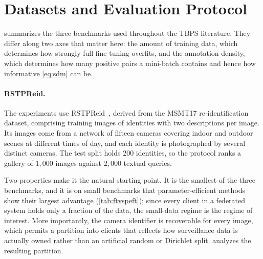 \section{Datasets and Evaluation Protocol}\label{sec:data}

 summarizes the three benchmarks used throughout the TBPS literature. They differ along two axes that matter here: the amount of training data, which determines how strongly full fine-tuning overfits, and the annotation density, which determines how many positive pairs a mini-batch contains and hence how informative \cref{eq:sdm} can be.

\begin{table}[t]
\centering\small
\caption{The three standard TBPS benchmarks, as reported by the authors of DM-Adapter and UP-Person. This report uses RSTPReid; the other two are retained for the extension described in \cref{sec:next}.}\label{tab:datasets}
\end{table}

\paragraph{RSTPReid.} The experiments use RSTPReid~\citep{Zhu_2021}, derived from the MSMT17 re-identification dataset, comprising \numTotImg{} training images of \numTotID{} identities with two descriptions per image. Its images come from a network of fifteen cameras covering indoor and outdoor scenes at different times of day, and each identity is photographed by several distinct cameras. The test split holds $200$ identities, so the protocol ranks a gallery of $1{,}000$ images against $2{,}000$ textual queries.

Two properties make it the natural starting point. It is the smallest of the three benchmarks, and it is on small benchmarks that parameter-efficient methods show their largest advantage (\cref{tab:ftvspeft}); since every client in a federated system holds only a fraction of the data, the small-data regime is the regime of interest. More importantly, the camera identifier is recoverable for every image, which permits a partition into clients that reflects how surveillance data is actually owned rather than an artificial random or Dirichlet split.  analyzes the resulting partition.

